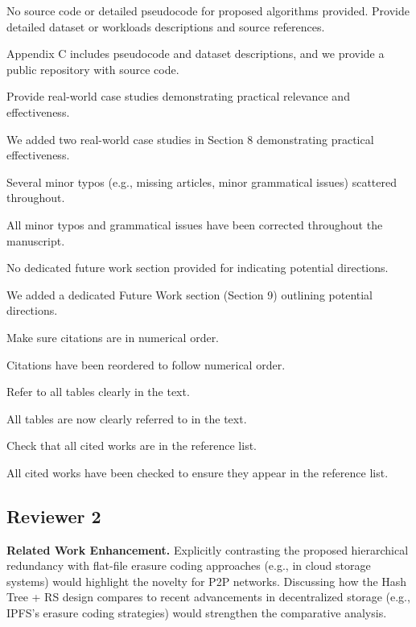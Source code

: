\documentclass[11pt]{article}
\newcommand{\us}{\rm \setlength{\leftskip}{0.3cm} \setlength{\rightskip}{0.3cm}}
\newcommand{\them}{\it \setlength{\leftskip}{0cm} \setlength{\rightskip}{0cm}}
\begin{document}
\them

No source code or detailed pseudocode for proposed algorithms provided. Provide detailed dataset or workloads descriptions and source references.

\us
Appendix C includes pseudocode and dataset descriptions, and we provide a public repository with source code.

\them

Provide real-world case studies demonstrating practical relevance and effectiveness.

\us
We added two real-world case studies in Section 8 demonstrating practical effectiveness.

\them

Several minor typos (e.g., missing articles, minor grammatical
issues) scattered throughout.

\us
All minor typos and grammatical issues have been corrected throughout the manuscript.

\them

No dedicated future work section provided for indicating potential directions.

\us
We added a dedicated Future Work section (Section 9) outlining potential directions.

\them

Make sure citations are in numerical order.

\us
Citations have been reordered to follow numerical order.

\them

Refer to all tables clearly in the text.

\us
All tables are now clearly referred to in the text.

\them

Check that all cited works are in the reference list.

\us
All cited works have been checked to ensure they appear in the reference list.

\them


\subsection*{Reviewer 2}

\textbf{Related Work Enhancement.} Explicitly contrasting the proposed hierarchical redundancy with flat-file erasure coding approaches (e.g., in cloud storage systems) would highlight the novelty for P2P networks. Discussing how the Hash Tree + RS design compares to recent advancements in decentralized storage (e.g., IPFS's erasure coding strategies) would strengthen the comparative analysis.
\end{document}
